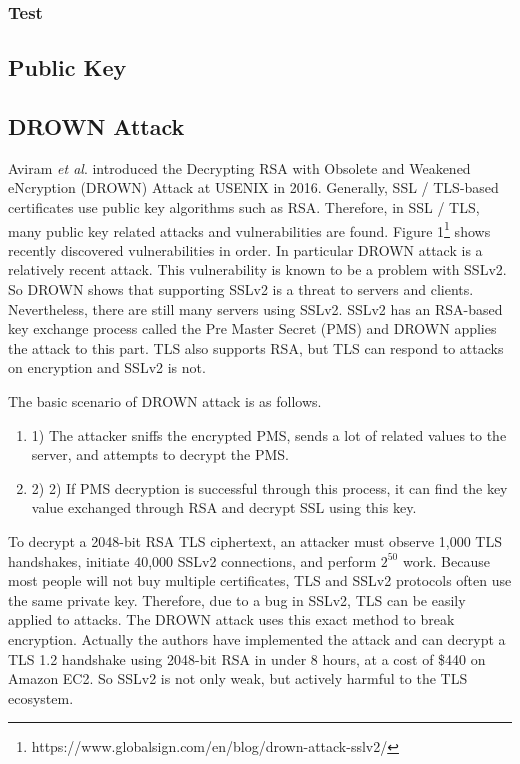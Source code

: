 \documentclass[a4paper]{article}
\begin{document}
\subsubsection{Test}



\subsection{Public Key}

\subsection{DROWN Attack}
Aviram \textit{et al}.\cite{drown} introduced the Decrypting RSA with Obsolete and Weakened eNcryption (DROWN)  Attack at USENIX in 2016. Generally, SSL / TLS-based certificates use public key algorithms such as RSA. Therefore, in SSL / TLS, many public key related attacks and vulnerabilities are found. Figure 1\footnote{https://www.globalsign.com/en/blog/drown-attack-sslv2/} shows recently discovered vulnerabilities in order. In particular DROWN attack is a relatively recent attack. This vulnerability is known to be a problem with SSLv2. So DROWN shows that supporting SSLv2 is a threat to servers and clients. Nevertheless, there are still many servers using SSLv2. SSLv2 has an RSA-based key exchange process called the Pre Master Secret (PMS) and DROWN applies the attack to this part. TLS also supports RSA, but TLS can respond to attacks on encryption and SSLv2 is not.

The basic scenario of DROWN attack is as follows. 
\begin{enumerate}[label=]
      \item 1) The attacker sniffs the encrypted PMS, sends a lot of related values to the server, and attempts to decrypt the PMS.
      
      \item 2) 2) If PMS decryption is successful through this process, it can find the key value exchanged through RSA and decrypt SSL using this key.
\end{enumerate}  

To decrypt a 2048-bit RSA TLS ciphertext, an attacker must observe 1,000 TLS handshakes, initiate 40,000 SSLv2 connections, and perform $2^{50}$ work. Because most people will not buy multiple certificates, TLS and SSLv2 protocols often use the same private key. Therefore, due to a bug in SSLv2, TLS can be easily applied to attacks. The DROWN attack uses this exact method to break encryption. Actually the authors have implemented the attack and can decrypt a TLS 1.2 handshake using 2048-bit RSA in under 8 hours, at a cost of \$440 on Amazon EC2. So SSLv2 is not only weak, but actively harmful to the TLS ecosystem.
\end{document}
